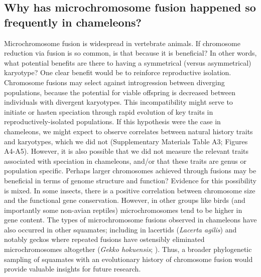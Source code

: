 \documentclass[a4paper, 12pt]{article}
\begin{document}
\subsection{Why has microchromosome fusion happened so frequently in chameleons?}
Microchromosome fusion is widespread in vertebrate animals\cite{waters2021microchromosomes}. 
If chromosome reduction via fusion is so common, is that because it is beneficial? In other words, what potential benefits are there to having a symmetrical (versus asymmetrical) karyotype? 
One clear benefit would be to reinforce reproductive isolation. 
Chromosome fusions may select against introgression between diverging populations, because the potential for viable offspring is decreased between individuals with divergent karyotypes\cite{cicconardi2021chromosome}.
This incompatibility might serve to initiate or hasten speciation through rapid evolution of key traits in reproductively-isolated populations. If this hypothesis were the case in chameleons, we might expect to observe correlates between natural history traits and karyotypes, which we did not (Supplementary Materials Table A3; Figures A4-A5). 
However, it is also possible that we did not measure the relevant traits associated with speciation in chameleons, and/or that these traits are genus or population specific.
Perhaps larger chromosomes achieved through fusions may be beneficial in terms of genome structure and function? Evidence for this possibility is mixed. In some insects, there is a positive correlation between chromosome size and the functional gene conservation\cite{cicconardi2021chromosome}. 
However, in other groups like birds (and importantly some non-avian reptiles) microchromosomes tend to be higher in gene content\cite{waters2021microchromosomes}.
The types of microchromosome fusions observed in chameleons have also occurred in other squamates\cite{deakin2016anchoring}; including in lacertids (\textit{Lacerta agilis}\cite{srikulnath2014identification}) and notably geckos where repeated fusions have ostensibly eliminated microchromosomes altogether (\textit{Gekko hokuensis}; \cite{srikulnath2015karyotype}). 
Thus, a broader phylogenetic sampling of squamates with an evolutionary history of chromosome fusion would provide valuable insights for future research.
\end{document}
